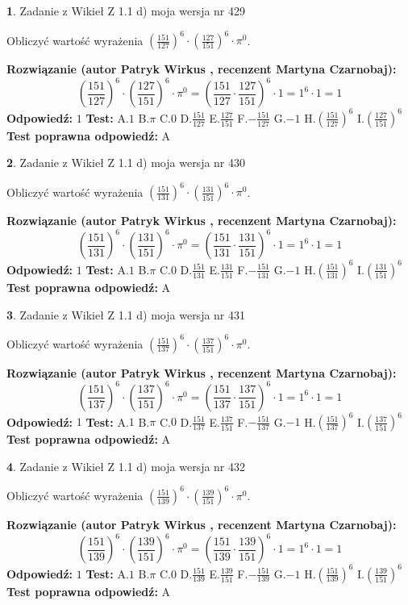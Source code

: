 \documentclass[12pt, a4paper]{article}
\theoremstyle{definition} %
\newtheorem{zad}{}
\newcommand{\zadStart}[1]{\begin{zad}#1\newline}
\newcommand{\zadStop}{\end{zad}}
\newcommand{\rozwStart}[2]{\noindent \textbf{Rozwiązanie (autor #1 , recenzent #2): }\newline}
\newcommand{\rozwStop}{\newline}
\newcommand{\odpStart}{\noindent \textbf{Odpowiedź:}\newline}
\newcommand{\odpStop}{\newline}
\newcommand{\testStart}{\noindent \textbf{Test:}\newline}
\newcommand{\testStop}{\newline}
\newcommand{\kluczStart}{\noindent \textbf{Test poprawna odpowiedź:}\newline}
\newcommand{\kluczStop}{\newline}
\begin{document}
\zadStart{Zadanie z Wikieł Z 1.1 d) moja wersja nr 429}

Obliczyć wartość wyrażenia $(\frac{151}{127})^{6} \cdot (\frac{127}{151})^{6} \cdot \pi^{0}$.
\zadStop
\rozwStart{Patryk Wirkus}{Martyna Czarnobaj}
$$(\frac{151}{127})^{6} \cdot (\frac{127}{151})^{6} \cdot \pi^{0} = (\frac{151}{127} \cdot \frac{127}{151})^{6} \cdot 1 = 1^{6} \cdot 1 = 1$$
\rozwStop
\odpStart
$1$
\odpStop
\testStart
A.$1$ B.$\pi$ C.$0$ D.$\frac{151}{127}$ E.$\frac{127}{151}$
F.$-\frac{151}{127}$ G.$-1$
H.$(\frac{151}{127})^{6}$
I.$(\frac{127}{151})^{6}$
\testStop
\kluczStart
A
\kluczStop



\zadStart{Zadanie z Wikieł Z 1.1 d) moja wersja nr 430}

Obliczyć wartość wyrażenia $(\frac{151}{131})^{6} \cdot (\frac{131}{151})^{6} \cdot \pi^{0}$.
\zadStop
\rozwStart{Patryk Wirkus}{Martyna Czarnobaj}
$$(\frac{151}{131})^{6} \cdot (\frac{131}{151})^{6} \cdot \pi^{0} = (\frac{151}{131} \cdot \frac{131}{151})^{6} \cdot 1 = 1^{6} \cdot 1 = 1$$
\rozwStop
\odpStart
$1$
\odpStop
\testStart
A.$1$ B.$\pi$ C.$0$ D.$\frac{151}{131}$ E.$\frac{131}{151}$
F.$-\frac{151}{131}$ G.$-1$
H.$(\frac{151}{131})^{6}$
I.$(\frac{131}{151})^{6}$
\testStop
\kluczStart
A
\kluczStop



\zadStart{Zadanie z Wikieł Z 1.1 d) moja wersja nr 431}

Obliczyć wartość wyrażenia $(\frac{151}{137})^{6} \cdot (\frac{137}{151})^{6} \cdot \pi^{0}$.
\zadStop
\rozwStart{Patryk Wirkus}{Martyna Czarnobaj}
$$(\frac{151}{137})^{6} \cdot (\frac{137}{151})^{6} \cdot \pi^{0} = (\frac{151}{137} \cdot \frac{137}{151})^{6} \cdot 1 = 1^{6} \cdot 1 = 1$$
\rozwStop
\odpStart
$1$
\odpStop
\testStart
A.$1$ B.$\pi$ C.$0$ D.$\frac{151}{137}$ E.$\frac{137}{151}$
F.$-\frac{151}{137}$ G.$-1$
H.$(\frac{151}{137})^{6}$
I.$(\frac{137}{151})^{6}$
\testStop
\kluczStart
A
\kluczStop



\zadStart{Zadanie z Wikieł Z 1.1 d) moja wersja nr 432}

Obliczyć wartość wyrażenia $(\frac{151}{139})^{6} \cdot (\frac{139}{151})^{6} \cdot \pi^{0}$.
\zadStop
\rozwStart{Patryk Wirkus}{Martyna Czarnobaj}
$$(\frac{151}{139})^{6} \cdot (\frac{139}{151})^{6} \cdot \pi^{0} = (\frac{151}{139} \cdot \frac{139}{151})^{6} \cdot 1 = 1^{6} \cdot 1 = 1$$
\rozwStop
\odpStart
$1$
\odpStop
\testStart
A.$1$ B.$\pi$ C.$0$ D.$\frac{151}{139}$ E.$\frac{139}{151}$
F.$-\frac{151}{139}$ G.$-1$
H.$(\frac{151}{139})^{6}$
I.$(\frac{139}{151})^{6}$
\testStop
\kluczStart
A
\kluczStop
\end{document}
